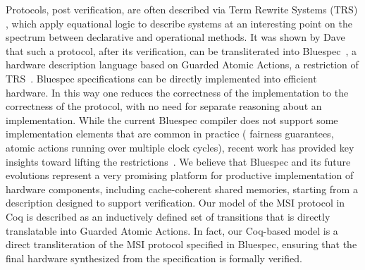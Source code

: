 Protocols, post verification, are often described via Term Rewrite Systems
(TRS) , which apply equational logic to describe
systems at an interesting point on the spectrum between declarative and
operational methods.  It was shown by Dave
\etal{}~\cite{DNA:CoherenceImplementation} that such a protocol, after its
verification, can be transliterated into Bluespec~\cite{Bluespec:TFRG}, a
hardware description language based on Guarded Atomic Actions, a restriction of
TRS~\cite{Hoe:TCAD}. Bluespec specifications can be directly implemented into
efficient hardware. In this way one reduces the correctness of the
implementation to the correctness of the protocol, with no need for separate
reasoning about an implementation. While the current Bluespec compiler does not
support some implementation elements that are common in practice (\eg{}
fairness guarantees, atomic actions running over multiple clock cycles), recent
work has provided key insights toward lifting the
restrictions~\cite{Karczmarek}. We believe that Bluespec and its future
evolutions represent a very promising platform for productive implementation of
hardware components, including cache-coherent shared memories, starting from a
description designed to support verification. Our model of the MSI protocol
in Coq is described as an inductively defined set of transitions that is
directly translatable into Guarded Atomic Actions. In fact, our Coq-based model
is a direct transliteration of the MSI protocol specified in Bluespec,
ensuring that the final hardware synthesized from the specification is formally
verified.

%

